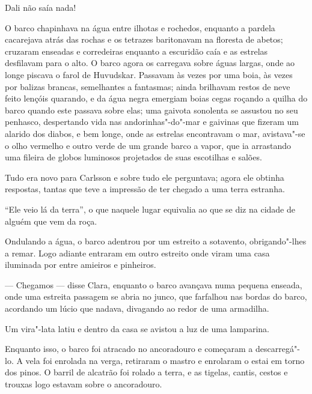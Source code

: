 Dali não saía nada!

O barco chapinhava na água entre ilhotas e rochedos, enquanto a pardela cacarejava
atrás das rochas e os tetrazes baritonavam na floresta de abetos; cruzaram
enseadas e corredeiras enquanto a escuridão caía e as estrelas desfilavam para o
alto. O barco agora os carregava sobre águas largas, onde ao longe piscava o
farol de Huvudskar. Passavam às vezes por uma boia, às vezes por balizas
brancas, semelhantes a fantasmas; ainda brilhavam restos de neve feito lençóis quarando, 
e da água negra emergiam boias cegas roçando a quilha do barco quando
este passava sobre elas; uma gaivota sonolenta se assustou no seu penhasco,
despertando vida nas andorinhas"-do"-mar e gaivinas que fizeram um alarido dos
diabos, e bem longe, onde as estrelas encontravam o mar, avistava"-se o olho
vermelho e outro verde de um grande barco a vapor, que ia arrastando uma fileira
de globos luminosos projetados de suas escotilhas e salões.

Tudo era novo para Carlsson e sobre tudo ele perguntava; agora ele obtinha
respostas, tantas que teve a impressão de ter chegado a uma terra estranha.

 ``Ele veio lá da terra'', o que naquele lugar equivalia ao que se diz na cidade
 de alguém que vem da roça.

Ondulando a água, o barco adentrou por um estreito a sotavento, obrigando"-lhes
a remar. Logo adiante entraram em outro estreito onde viram uma casa iluminada
por entre amieiros e pinheiros.

--- Chegamos --- disse Clara, enquanto o barco avançava numa pequena
enseada, onde uma estreita passagem se abria no junco, que farfalhou nas bordas
do barco, acordando um lúcio que nadava, divagando ao redor de uma armadilha.

Um vira"-lata latiu e dentro da casa se avistou a luz de uma lamparina.

Enquanto isso, o barco foi atracado no ancoradouro e começaram a descarregá"-lo.
A vela foi enrolada na verga, retiraram o mastro e enrolaram o estai em torno
dos pinos. O barril de alcatrão foi rolado a terra, e as tigelas, cantis, cestos
e trouxas logo estavam sobre o ancoradouro.

